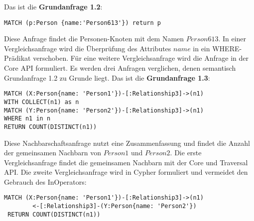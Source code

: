 \noindent Das ist die \textbf{Grundanfrage 1.2}: 
\begin{Verbatim}[frame=single]
MATCH (p:Person {name:'Person613'}) return p
\end{Verbatim} 
Diese Anfrage findet die Personen-Knoten mit dem Namen $Person613$. In einer Vergleichsanfrage wird die Überprüfung des Attributes $name$ in ein WHERE-Prädikat verschoben. Für eine weitere Vergleichsanfrage wird die Anfrage in der Core API formuliert. Es werden drei Anfragen verglichen, denen semantisch Grundanfrage 1.2 zu Grunde liegt.\newline \newline
Das ist die \textbf{Grundanfrage 1.3}: 
\begin{Verbatim}[frame=single]
MATCH (X:Person{name: 'Person1'})-[:Relationship3]->(n1) 
WITH COLLECT(n1) as n 
MATCH (Y:Person{name: 'Person2'})-[:Relationship3]->(n1) 
WHERE n1 in n
RETURN COUNT(DISTINCT(n1))
\end{Verbatim} 
Diese Nachbarschaftsanfrage nutzt eine Zusammenfassung und findet die Anzahl der gemeinsamen Nachbarn von $Person1$ und $Person2$. Die erste Vergleichsanfrage findet die gemeinsamen Nachbarn mit der Core und Traversal API. Die zweite  Vergleichsanfrage wird in Cypher formuliert und vermeidet den Gebrauch des InOperators:
\begin{Verbatim}[frame=single]
 MATCH (X:Person{name: 'Person1'})-[:Relationship3]->(n1)
 		<-[:Relationship3]-(Y:Person{name: 'Person2'}) 
 RETURN COUNT(DISTINCT(n1))
\end{Verbatim} 


